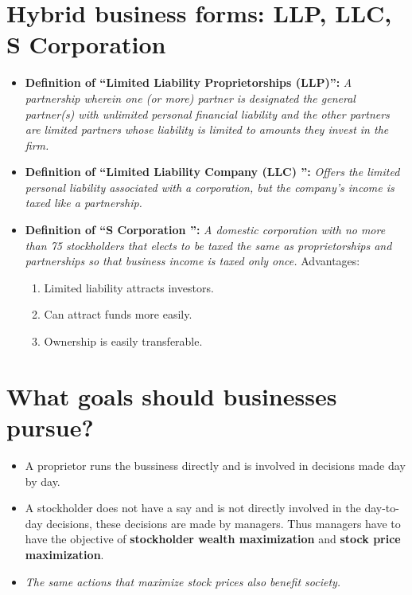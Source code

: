 \documentclass{article}
\renewcommand{\termdefinition}[2]{
    \textbf{Definition of ``#1'':} \emph{#2}
}
\begin{document}
\section{Hybrid business forms: LLP, LLC, S Corporation}
\begin{itemize}
    \item \termdefinition{Limited Liability Proprietorships (LLP)}{ A partnership wherein one (or more) partner is designated the general partner(s) with unlimited personal financial liability and the other partners are limited partners whose liability is limited to amounts they invest in the firm.} 
    \item \termdefinition{Limited Liability Company (LLC) }{Offers the limited personal liability associated with a corporation, but the company’s income is taxed like a partnership. } 
    \item \termdefinition{S Corporation }{A domestic corporation with no more than 75 stockholders that elects to be taxed the same as proprietorships and partnerships so that business income is taxed only once.} Advantages: 
        \begin{enumerate}
            \item Limited liability attracts investors. 
            \item Can attract funds more easily. 
            \item Ownership is easily transferable. 
        \end{enumerate}
\end{itemize}


\section{What goals should businesses pursue?}
\begin{itemize}
    \item A proprietor runs the bussiness directly and is involved in decisions made day by day. 
    \item A stockholder does not have a say and is not directly involved in the day-to-day decisions, these decisions are made by managers. Thus managers have to have the objective of \textbf{stockholder wealth maximization} and \textbf{stock price maximization}.
    \item \emph{The same actions that maximize stock prices also benefit society.}
\end{itemize}
\end{document}
